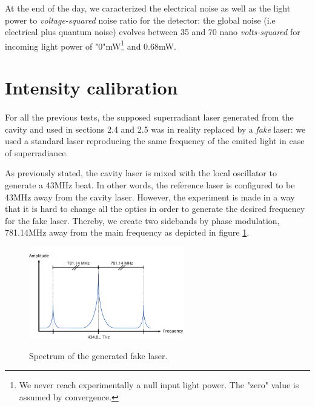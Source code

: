\documentclass[12pt]{report}
\begin{document}
At the end of the day, we caracterized the electrical noise as well as the light power to \textit{voltage-squared} noise ratio for the detector: the global noise (i.e electrical plus quantum noise) evolves between 35 and 70 nano \textit{volts-squared} for incoming light power of "0"mW\footnote{We never reach experimentally a null input light power. The "zero" value is assumed by convergence.} and 0.68mW.

\section{Intensity calibration}
\paragraph{}

For all the previous tests, the supposed superradiant laser generated from the cavity and used in sections 2.4 and 2.5 was in reality replaced by a \textit{fake} laser: we used a standard laser reproducing the same frequency of the emited light in case of superradiance.

As previously stated, the cavity laser is mixed with the local oscillator to generate a 43MHz beat. In other words, the reference laser is configured to be 43MHz away from the cavity laser. However, the experiment is made in a way that it is hard to change all the optics in order to generate the desired frequency for the fake laser. Thereby, we create two sidebands by phase modulation, 781.14MHz away from the main frequency as depicted in figure \ref{fig:sb-def}.

\begin{figure}[h!]
\caption{Spectrum of the generated fake laser.}
\centering
\includegraphics[width=0.6\textwidth]{sb-def}
\label{fig:sb-def}
\end{figure}
\end{document}

